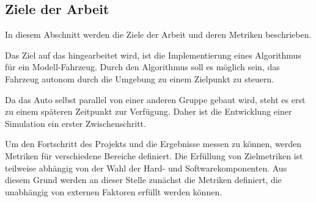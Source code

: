 \subsection{Ziele der Arbeit}
In diesem Abschnitt werden die Ziele der Arbeit und deren Metriken beschrieben.

Das Ziel auf das hingearbeitet wird, ist die Implementierung eines Algorithmus für ein Modell-Fahrzeug. 
Durch den Algorithmus soll es möglich sein, das Fahrzeug autonom durch die Umgebung zu einem Zielpunkt zu steuern.

Da das Auto selbst parallel von einer anderen Gruppe gebaut wird, steht es erst zu einem späteren Zeitpunkt zur Verfügung. 
Daher ist die Entwicklung einer Simulation ein erster Zwischenschritt. 

Um den Fortschritt des Projekts und die Ergebnisse messen zu können, werden Metriken für verschiedene Bereiche definiert.
Die Erfüllung von Zielmetriken ist teilweise abhängig von der Wahl der Hard- und Softwarekomponenten.
Aus diesem Grund werden an dieser Stelle zunächst die Metriken definiert, die unabhängig von externen Faktoren erfüllt werden können. 

